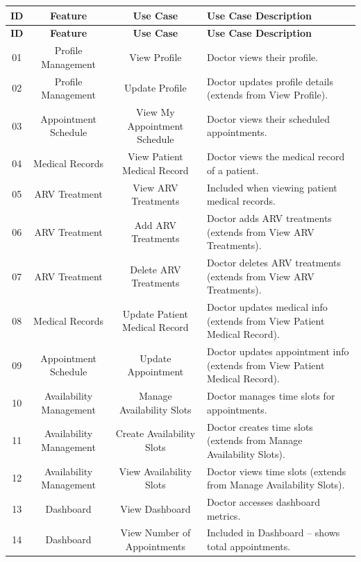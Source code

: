\documentclass[12pt,a4paper]{article}
\begin{document}
\renewcommand{\arraystretch}{1.5}
\begin{longtable}{|c|c|c|p{7.5cm}|}
\hline
\textbf{ID} & \textbf{Feature} & \textbf{Use Case} & \textbf{Use Case Description} \\
\hline
\endfirsthead

\hline
\textbf{ID} & \textbf{Feature} & \textbf{Use Case} & \textbf{Use Case Description} \\
\hline
\endhead

01 & Profile Management & View Profile & Doctor views their profile. \\
\hline
02 & Profile Management & Update Profile & Doctor updates profile details (extends from View Profile). \\
\hline
03 & Appointment Schedule & View My Appointment Schedule & Doctor views their scheduled appointments. \\
\hline
04 & Medical Records & View Patient Medical Record & Doctor views the medical record of a patient. \\
\hline
05 & ARV Treatment & View ARV Treatments & Included when viewing patient medical records. \\
\hline
06 & ARV Treatment & Add ARV Treatments & Doctor adds ARV treatments (extends from View ARV Treatments). \\
\hline
07 & ARV Treatment & Delete ARV Treatments & Doctor deletes ARV treatments (extends from View ARV Treatments). \\
\hline
08 & Medical Records & Update Patient Medical Record & Doctor updates medical info (extends from View Patient Medical Record). \\
\hline
09 & Appointment Schedule & Update Appointment & Doctor updates appointment info (extends from View Patient Medical Record). \\
\hline
10 & Availability Management & Manage Availability Slots & Doctor manages time slots for appointments. \\
\hline
11 & Availability Management & Create Availability Slots & Doctor creates time slots (extends from Manage Availability Slots). \\
\hline
12 & Availability Management & View Availability Slots & Doctor views time slots (extends from Manage Availability Slots). \\
\hline
13 & Dashboard & View Dashboard & Doctor accesses dashboard metrics. \\
\hline
14 & Dashboard & View Number of Appointments & Included in Dashboard – shows total appointments. \\

\end{longtable}
\end{document}
